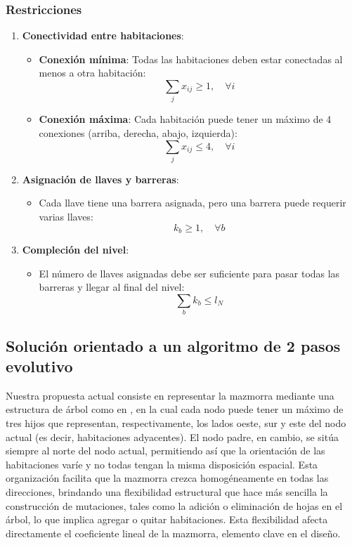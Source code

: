 \documentclass[letter, 10pt]{article}
\begin{document}
\subsubsection*{Restricciones}
\begin{enumerate}
    \item \textbf{Conectividad entre habitaciones}:
    \begin{itemize}
        \item \textbf{Conexi\'on m\'inima}: Todas las habitaciones deben estar conectadas al menos a otra habitaci\'on:
        \[
        \sum_{j} x_{ij} \geq 1, \quad \forall i
        \]
        \item \textbf{Conexi\'on m\'axima}: Cada habitaci\'on puede tener un m\'aximo de 4 conexiones (arriba, derecha, abajo, izquierda):
        \[
        \sum_{j} x_{ij} \leq 4, \quad \forall i
        \]
    \end{itemize}
    
    \item \textbf{Asignaci\'on de llaves y barreras}:
    \begin{itemize}
        \item Cada llave tiene una barrera asignada, pero una barrera puede requerir varias llaves:
        \[
        k_b \geq 1, \quad \forall b
        \]
    \end{itemize}
    
    \item \textbf{Compleci\'on del nivel}:
    \begin{itemize}
        \item El n\'umero de llaves asignadas debe ser suficiente para pasar todas las barreras y llegar al final del nivel:
        \[
        \sum_{b} k_b \leq l_N
        \]
    \end{itemize}
\end{enumerate}

\subsection*{Soluci\'on orientado a un algoritmo de 2 pasos evolutivo}

Nuestra propuesta actual consiste en representar la mazmorra mediante una estructura de \'arbol como en \cite{Dumont2024}, en la cual cada nodo puede tener un m\'aximo de tres hijos que representan, respectivamente, los lados oeste, sur y este del nodo actual (es decir, habitaciones adyacentes). El nodo padre, en cambio, se sit\'ua siempre al norte del nodo actual, permitiendo as\'i que la orientaci\'on de las habitaciones var\'ie y no todas tengan la misma disposici\'on espacial. Esta organizaci\'on facilita que la mazmorra crezca homog\'eneamente en todas las direcciones, brindando una flexibilidad estructural que hace m\'as sencilla la construcci\'on de mutaciones, tales como la adici\'on o eliminaci\'on de hojas en el \'arbol, lo que implica agregar o quitar habitaciones. Esta flexibilidad afecta directamente el coeficiente lineal de la mazmorra, elemento clave en el dise\~no.
\end{document}
